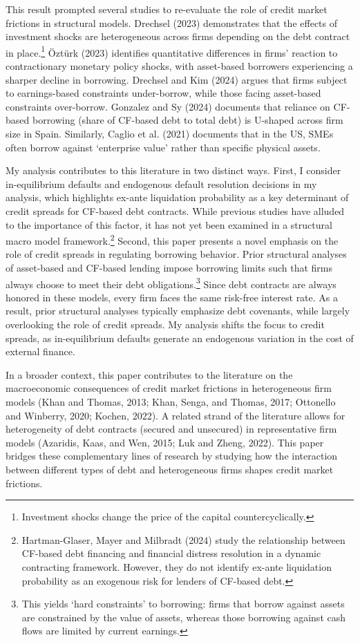 \documentclass[12pt]{article}
\begin{document}
This result prompted several studies to re-evaluate the role of credit market frictions in structural models. Drechsel (2023) demonstrates that the effects of investment shocks are heterogeneous across firms depending on the debt contract in place.\footnote{Investment shocks change the price of the capital countercyclically.} Öztürk (2023) identifies quantitative differences in firms' reaction to contractionary monetary policy shocks, with asset-based borrowers experiencing a sharper decline in borrowing. Drechsel and Kim (2024) argues that firms subject to earnings-based constraints under-borrow, while those facing asset-based constraints over-borrow. Gonzalez and Sy (2024) documents that reliance on CF-based borrowing (share of CF-based debt to total debt) is U-shaped across firm size in Spain. Similarly, Caglio et al. (2021) documents that in the US, SMEs often borrow against `enterprise value' rather than specific physical assets.

My analysis contributes to this literature in two distinct ways. First, I consider in-equilibrium defaults and endogenous default resolution decisions in my analysis, which highlights ex-ante liquidation probability as a key determinant of credit spreads for CF-based debt contracts. While previous studies have alluded to the importance of this factor, it has not yet been examined in a structural macro model framework.\footnote{Hartman-Glaser, Mayer and Milbradt (2024) study the relationship between CF-based debt financing and financial distress resolution in a dynamic contracting framework. However, they do not identify ex-ante liquidation probability as an exogenous risk for lenders of CF-based debt.} Second, this paper presents a novel emphasis on the role of credit spreads in regulating borrowing behavior. Prior structural analyses of asset-based and CF-based lending impose borrowing limits such that firms always choose to meet their debt obligations.\footnote{This yields `hard constraints' to borrowing: firms that borrow against assets are constrained by the value of assets, whereas those borrowing against cash flows are limited by current earnings.} Since debt contracts are always honored in these models, every firm faces the same risk-free interest rate. As a result, prior structural analyses typically emphasize debt covenants, while largely overlooking the role of credit spreads. My analysis shifts the focus to credit spreads, as in-equilibrium defaults generate an endogenous variation in the cost of external finance. 

In a broader context, this paper contributes to the literature on the macroeconomic consequences of credit market frictions in heterogeneous firm models (Khan and Thomas, 2013; Khan, Senga, and Thomas, 2017; Ottonello and Winberry, 2020; Kochen, 2022). A related strand of the literature allows for heterogeneity of debt contracts (secured and unsecured) in representative firm models (Azaridis, Kaas, and Wen, 2015; Luk and Zheng, 2022). This paper bridges these complementary lines of research by studying how the interaction between different types of debt and heterogeneous firms shapes credit market frictions.
\end{document}
